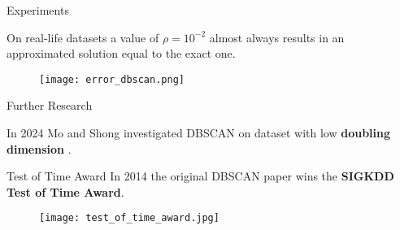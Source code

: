 \documentclass[aspectratio=169]{beamer}
\begin{document}
\begin{frame}{Experiments}

    On real-life datasets a value of $\rho=10^{-2}$ almost always results in an approximated solution equal to the exact one.

    \vspace{0.5cm}

    \begin{figure}
        \centering
        \texttt{[image: error\_dbscan.png]}
    \end{figure}
    
\end{frame}

\begin{frame}{Further Research}

    In 2024 Mo and Shong investigated DBSCAN on dataset with low \textbf{doubling dimension} \cite{doubling_dimension}.

    \vspace{0.5cm}

    \centering {}
\end{frame}

\begin{frame}{Test of Time Award}
    In 2014 the original DBSCAN paper wins the \textbf{SIGKDD Test of Time Award}.

\vspace{0.5cm}
    
    \begin{figure}
        \centering
        \texttt{[image: test\_of\_time\_award.jpg]}
    \end{figure}
    
\end{frame}
\end{document}
